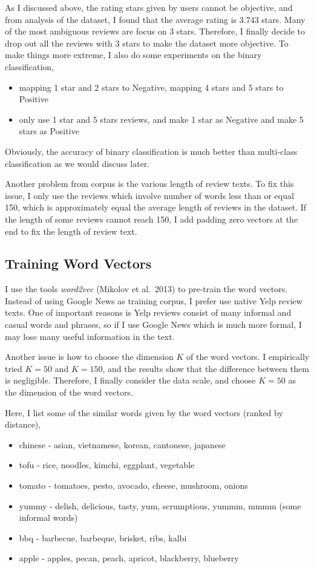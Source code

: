 \documentclass[11pt]{article}
\theoremstyle{definition}
\theoremstyle{basic}
\begin{document}
As I discussed above, the rating stars given by users cannot be objective, and from analysis of the dataset, I found that the average rating is 3.743 stars.
Many of the most ambiguous reviews are focus on 3 stars.
Therefore, I finally decide to drop out all the reviews with 3 stars to make the dataset more objective.
To make things more extreme, I also do some experiments on the binary classification,
\begin{itemize}
    \item mapping 1 star and 2 stars to Negative, mapping 4 stars and 5 stars to Positive
    \item only use 1 star and 5 stars reviews, and make 1 star as Negative and make 5 stars as Positive
\end{itemize}
Obviously, the accuracy of binary classification is much better than multi-class classification as we would discuss later.

Another problem from corpus is the various length of review texts.
To fix this issue, I only use the reviews which involve number of words less than or equal 150, which is approximately equal the average length of reviews in the dataset.
If the length of some reviews cannot reach 150, I add padding zero vectors at the end to fix the length of review text.

\subsection{Training Word Vectors}

I use the tools \textit{word2vec} (Mikolov et al.\ 2013) to pre-train the word vectors.
Instead of using Google News as training corpus, I prefer use native Yelp review texts.
One of important reasons is Yelp reviews consist of many informal and casual words and phrases, so if I use Google News which is much more formal, I may lose many useful information in the text.

Another issue is how to choose the dimension $K$ of the word vectors.
I empirically tried $K = 50$ and $K = 150$, and the results show that the difference between them is negligible.
Therefore, I finally consider the data scale, and choose $K = 50$ as the dimension of the word vectors.

Here, I list some of the similar words given by the word vectors (ranked by distance),

\begin{itemize}
    \item chinese - asian, vietnamese, korean, cantonese, japanese
    \item tofu - rice, noodles, kimchi, eggplant, vegetable
    \item tomato - tomatoes, pesto, avocado, cheese, mushroom, onions
    \item yummy - delish, delicious, tasty, yum, scrumptious, yummm, mmmm (some informal words)
    \item bbq - barbecue, barbeque, brisket, ribs, kalbi
    \item apple - apples, pecan, peach, apricot, blackberry, blueberry
\end{itemize}
\end{document}

